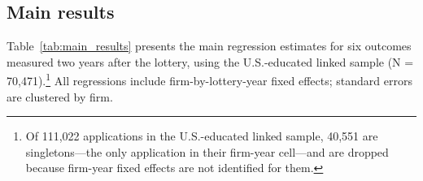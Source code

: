 
\subsection{Main results}

Table~\ref{tab:main_results} presents the main regression estimates for six outcomes measured two years after the lottery, using the U.S.-educated linked sample (N = 70,471).\footnote{Of 111,022 applications in the U.S.-educated linked sample, 40,551 are singletons---the only application in their firm-year cell---and are dropped because firm-year fixed effects are not identified for them.} All regressions include firm-by-lottery-year fixed effects; standard errors are clustered by firm.

